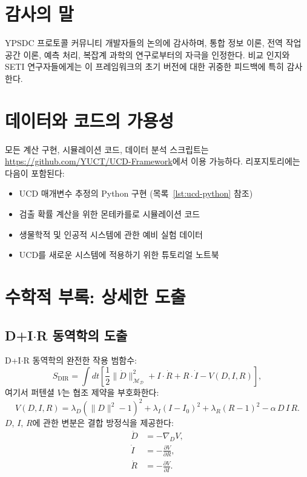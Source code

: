 \documentclass[11pt,a4paper]{article}
\newcommand{\Dict}{\mathcal{D}}
\newcommand{\Mdict}{\mathcal{M}_{\Dict}}
\begin{document}
	\section*{감사의 말}
	
	YPSDC 프로토콜 커뮤니티 개발자들의 논의에 감사하며, 통합 정보 이론, 전역 작업 공간 이론, 예측 처리, 복잡계 과학의 연구로부터의 자극을 인정한다. 비교 인지와 SETI 연구자들에게는 이 프레임워크의 초기 버전에 대한 귀중한 피드백에 특히 감사한다.
	
	\section*{데이터와 코드의 가용성}
	
	모든 계산 구현, 시뮬레이션 코드, 데이터 분석 스크립트는 \url{https://github.com/YUCT/UCD-Framework}에서 이용 가능하다. 리포지토리에는 다음이 포함된다:
	\begin{itemize}
		\item UCD 매개변수 추정의 Python 구현 (목록~\ref{lst:ucd-python} 참조)
		\item 검출 확률 계산을 위한 몬테카를로 시뮬레이션 코드
		\item 생물학적 및 인공적 시스템에 관한 예비 실험 데이터
		\item UCD를 새로운 시스템에 적용하기 위한 튜토리얼 노트북
	\end{itemize}
	
	\appendix
	
	\section{수학적 부록: 상세한 도출}
	
	\subsection{D+I\(\cdot\)R 동역학의 도출}
	
	D+I\(\cdot\)R 동역학의 완전한 작용 범함수:
	\[
	S_{\mathrm{DIR}} = \int dt \left[ \frac{1}{2}\|\dot{D}\|^2_{\Mdict} + I \cdot \dot{R} + R \cdot \dot{I} - V(D,I,R) \right],
	\]
	여기서 퍼텐셜 \(V\)는 협조 제약을 부호화한다:
	\[
	V(D,I,R) = \lambda_D (\|D\|^2 - 1)^2 + \lambda_I (I - I_0)^2 + \lambda_R (R - 1)^2 - \alpha\, D\,I\,R.
	\]
	\(D\), \(I\), \(R\)에 관한 변분은 결합 방정식을 제공한다:
	\begin{align*}
		\ddot{D} &= -\nabla_D V, \\
		\dot{I}  &= -\frac{\partial V}{\partial R}, \\
		\dot{R}  &= -\frac{\partial V}{\partial I}.
	\end{align*}
	
\end{document}
